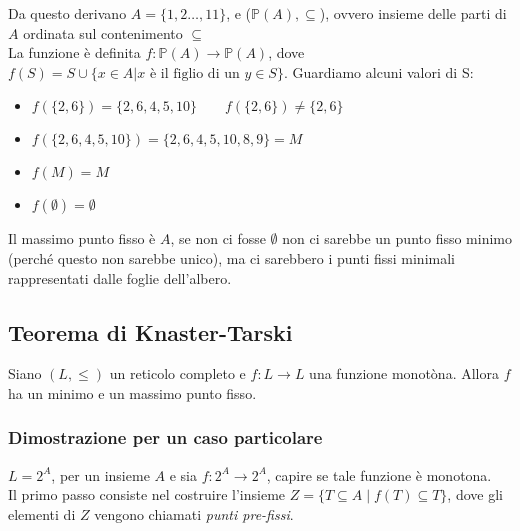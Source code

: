 \begin{enumerate}
{
    \par}
    Da questo derivano $A = \{1,2 \dots, 11\}$, e ($\mathbb{P}(A), \subseteq$), ovvero insieme delle parti di $A$ ordinata sul contenimento $\subseteq$\\
    La funzione è definita $f:\mathbb{P}(A) \to \mathbb{P}(A)$, dove $f(S) = S \cup \{x \in A | x \mbox{ è il figlio di un } y\in S\}$. Guardiamo alcuni valori di S:
    \begin{itemize}
        \item $f(\{2,6\}) = \{2,6,4,5,10\} \qquad f(\{2,6\}) \neq \{2,6\}$
        \item $f(\{2,6,4,5,10\}) = \{2,6,4,5,10,8,9\} = M $ 
        \item $f(M) = M$ 
        \item $f(\emptyset) = \emptyset$ 
    \end{itemize}
    Il massimo punto fisso è $A$, se non ci fosse $\emptyset$ non ci sarebbe un punto fisso minimo (perché questo non sarebbe unico), ma ci sarebbero i punti fissi minimali rappresentati dalle foglie dell'albero.
\end{enumerate}

\subsection{Teorema di Knaster-Tarski}
Siano $(L, \leq)$ un reticolo completo e $f:L \to L$ una funzione monotòna. Allora $f$ ha un minimo e un massimo punto fisso.
\subsubsection{Dimostrazione per un caso particolare}
$L=2^A$, per un insieme $A$ e sia $f : 2^A \to 2^A$, capire se tale funzione è monotona. \\
Il primo passo consiste nel costruire l’insieme $Z = \{T \subseteq A \; | \; f(T) \subseteq T\}$, dove gli elementi di $Z$ vengono chiamati \textit{punti pre-fissi}. \\ 

